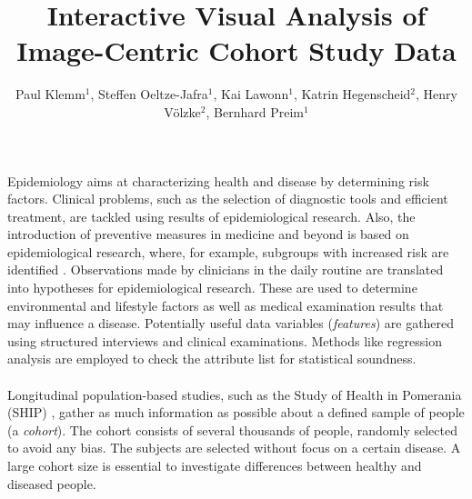 \documentclass[journal]{style/vgtc} 			          %
\title{Interactive Visual Analysis of Image-Centric Cohort Study Data}
\author{Paul Klemm$^{1}$, Steffen Oeltze-Jafra$^{1}$, Kai Lawonn$^{1}$, Katrin Hegenscheid$^{2}$, Henry V{\"o}lzke$^{2}$, Bernhard Preim$^{1}$}
\begin{document}


\maketitle
Epidemiology aims at characterizing health and disease by determining risk factors.
%
Clinical problems, such as the selection of diagnostic tools and efficient treatment, are tackled using results of epidemiological research.
%
Also, the introduction of preventive measures in medicine and beyond is based on epidemiological research, where, for example, subgroups with increased risk are identified \cite{Fletcher2012}.
%
Observations made by clinicians in the daily routine are translated into hypotheses for epidemiological research.
%
These are used to determine environmental and lifestyle factors as well as medical examination results that may influence a disease.
%
Potentially useful data variables (\emph{features}) are gathered using structured interviews and clinical examinations.
%
Methods like regression analysis are employed to check the attribute list for statistical soundness.
%
\\\\
Longitudinal population-based studies, such as the Study of Health in Pomerania (SHIP) \cite{Volzke2011}, gather as much information as possible about a defined sample of people (a \emph{cohort}).
%
The cohort consists of several thousands of people, randomly selected to avoid any bias.
%
The subjects are selected without focus on a certain disease.
%
A large cohort size is essential to investigate differences between healthy and diseased people.
%
\end{document}

